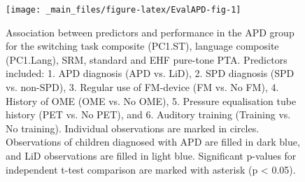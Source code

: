 \documentclass[a4paper, twoside]{templates/ociamthesis}
\begin{document}
\begin{figure}

{\centering \texttt{[image: \_main\_files/figure-latex/EvalAPD-fig-1]} 

}

\caption{Association between predictors and performance in the APD group for the switching task composite (PC1.ST), language composite (PC1.Lang), SRM, standard and EHF pure-tone PTA. Predictors included: 1. APD diagnosis (APD vs. LiD), 2. SPD diagnosis (SPD vs. non-SPD), 3. Regular use of FM-device (FM vs. No FM), 4. History of OME (OME vs. No OME), 5. Pressure equalisation tube history (PET vs. No PET), and 6. Auditory training (Training vs. No training). Individual observations are marked in circles. Observations of children diagnosed with APD are filled in dark blue, and LiD observations are filled in light blue. Significant p-values for independent t-test comparison are marked with asterisk (p < 0.05).}\label{fig:EvalAPD-fig}
\end{figure}
\end{document}
